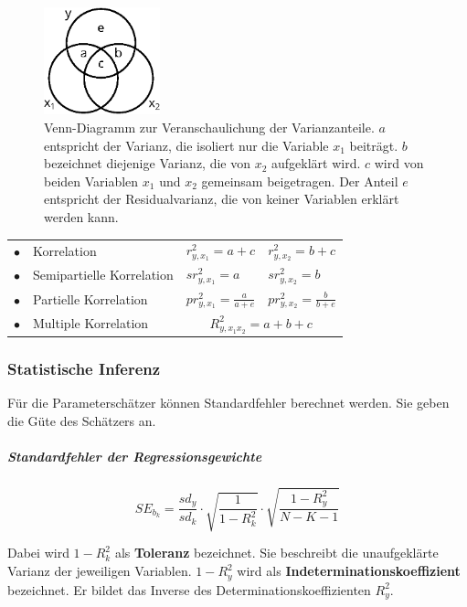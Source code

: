 \documentclass{article}
\numberwithin{equation}{section}
\begin{document}
\begin{figure}
  \centering
  \includegraphics[width=0.3\textwidth]{images/venn.eps}
  \caption{Venn-Diagramm zur Veranschaulichung der Varianzanteile. $a$ entspricht der Varianz, die isoliert nur die Variable $x_1$ beiträgt. $b$ bezeichnet diejenige Varianz, die von $x_2$ aufgeklärt wird. $c$ wird von beiden Variablen $x_1$ und $x_2$ gemeinsam beigetragen. Der Anteil $e$ entspricht der Residualvarianz, die von keiner Variablen erklärt werden kann.}
  \label{img:venn}
\end{figure}

\begin{tabular}{llll}
$\bullet$ & Korrelation & $r^2_{y,x_1} = a + c$ & $r^2_{y,x_2} = b + c$\\
$\bullet$ & Semipartielle Korrelation & $sr^2_{y,x_1} = a$ & $sr^2_{y,x_2} = b$\\
$\bullet$ & Partielle Korrelation & $pr^2_{y,x_1} = \frac{a}{a+e}$ & $pr^2_{y,x_2} = \frac{b}{b+e}$\\
$\bullet$ & Multiple Korrelation & \multicolumn{2}{c}{$R^2_{y,x_1x_2} = a + b + c$}
\end{tabular}

\subsubsection{Statistische Inferenz}

Für die Parameterschätzer können Standardfehler berechnet werden. Sie geben die Güte des Schätzers an.

\subparagraph{Standardfehler der Regressionsgewichte}

\begin{equation}
SE_{b_k} = \frac{sd_y}{sd_k} \cdot \sqrt{\frac{1}{1-R_k^2}} \cdot \sqrt{\frac{1-R_y^2}{N-K-1}}
\end{equation}

Dabei wird $1-R_k^2$ als \textbf{Toleranz} bezeichnet. Sie beschreibt die unaufgeklärte Varianz der jeweiligen Variablen. $1-R_y^2$ wird als \textbf{Indeterminationskoeffizient} bezeichnet. Er bildet das Inverse des Determinationskoeffizienten $R_y^2$.
\end{document}
